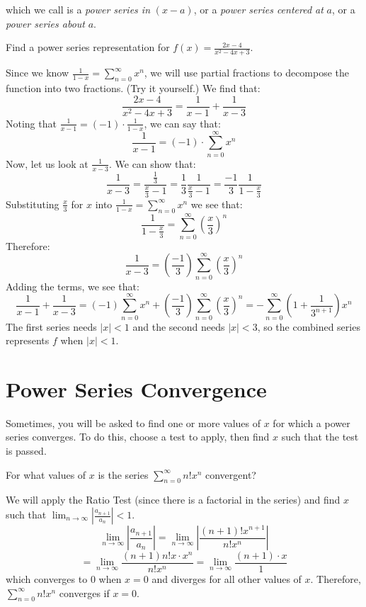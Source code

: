 which we call is a \textit{power series in }$(x - a)$, or a \textit{power 
series centered at }$a$, or a \textit{power series about }$a$. 

\begin{Worked}
\begin{Problem}
Find a power series representation for $f(x) = \frac{2x - 4}{
x^2 - 4x +3}$. 
\end{Problem}
\begin{Solution}
Since we know $\frac{1}{1-x} = \sum_{n=0}^\infty x^n$, we 
will use partial fractions to decompose the function into two fractions. (Try it yourself.) We find that:
$$\frac{2x - 4}{x^2 - 4x + 3} = \frac{1}{x - 1} + \frac{1}{x-3}$$
Noting that $\frac{1}{x-1} = (-1) \cdot\frac{1}{1-x}$, we can say that:
$$\frac{1}{x-1} = (-1) \cdot \sum_{n=0}^\infty x^n$$
Now, let us look at $\frac{1}{x-3}$. We can show that:
$$\frac{1}{x-3} = \frac{\frac{1}{3}}{\frac{x}{3}-1} = \frac{1}{3} \frac{1}{
\frac{x}{3}-1} = \frac{-1}{3} \frac{1}{1-\frac{x}{3}}$$
Substituting $\frac{x}{3}$ for $x$ into $\frac{1}{1-x} = \sum_{n=0}^\infty 
x^n$ we see that:
$$\frac{1}{1-\frac{x}{3}} = \sum_{n=0}^\infty \left(\frac{x}{3} \right)^n$$
Therefore:
$$\frac{1}{x-3} = \left( \frac{-1}{3} \right) \sum_{n=0}^\infty \left( 
\frac{x}{3} \right)^n$$
Adding the terms, we see that:
$$\frac{1}{x-1} + \frac{1}{x-3} = (-1) \sum_{n=0}^\infty x^n + \left( 
\frac{-1}{3} \right) \sum_{n=0}^\infty \left( \frac{x}{3} \right)^n
= -\sum_{n=0}^\infty \left(1 + \frac{1}{3^{n+1}}\right) x^n$$
The first series needs $|x| < 1$ and the second needs $|x| < 3$, so the
combined series represents $f$ when $|x| < 1$.
\end{Solution}
\end{Worked}

\section{Power Series Convergence}
Sometimes, you will be asked to find one or more values of $x$ 
for which a power series converges. To do this, choose a test to apply, 
then find $x$ such that the test is passed. 

\begin{Worked}
\begin{Problem}
For what values of $x$ is the series $\sum_{n=0}^\infty n!x^n$ 
convergent?
\end{Problem}
\begin{Solution}
We will apply the Ratio Test (since there is a factorial in 
the series) and find $x$ such that $\lim_{n \to \infty} \left| \frac{a_{n+1}}{
a_n} \right| < 1$. 
$$\lim_{n \to \infty} \left| \frac{a_{n + 1}}{a_n} \right| = \lim_{n \to 
\infty} \left| \frac{(n+1)!x^{n+1}}{n!x^n} \right|$$
$$= \lim_{n \to \infty} \frac{(n+1) n! x \cdot x^n}{n!x^n} = \lim_{n \to 
\infty} \frac{(n+1) \cdot x}{1}$$
which converges to $0$ when $x=0$ and diverges for all other values of $x$. 
Therefore, $\sum_{n=0}^\infty n!x^n$ converges if $x=0$. 
\end{Solution}
\end{Worked}

